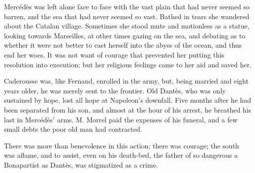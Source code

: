 Mercédès was left alone face to face with the vast plain that had never
seemed so barren, and the sea that had never seemed so vast. Bathed in
tears she wandered about the Catalan village. Sometimes she stood mute
and motionless as a statue, looking towards Marseilles, at other times
gazing on the sea, and debating as to whether it were not better to
cast herself into the abyss of the ocean, and thus end her woes. It was
not want of courage that prevented her putting this resolution into
execution; but her religious feelings came to her aid and saved her.

Caderousse was, like Fernand, enrolled in the army, but, being married
and eight years older, he was merely sent to the frontier. Old Dantès,
who was only sustained by hope, lost all hope at Napoleon’s downfall.
Five months after he had been separated from his son, and almost at the
hour of his arrest, he breathed his last in Mercédès’ arms. M. Morrel
paid the expenses of his funeral, and a few small debts the poor old
man had contracted.

There was more than benevolence in this action; there was courage; the
south was aflame, and to assist, even on his death-bed, the father of
so dangerous a Bonapartist as Dantès, was stigmatized as a crime.
